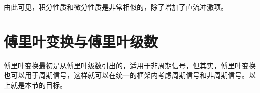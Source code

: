 由此可见，积分性质和微分性质是非常相似的，除了增加了直流冲激项。

\section{傅里叶变换与傅里叶级数}
傅里叶变换最初是从傅里叶级数引出的，适用于非周期信号，但其实，傅里叶变换也可以用于周期信号，这样就可以在统一的框架内考虑周期信号和非周期信号。以上就是本节的目标。

